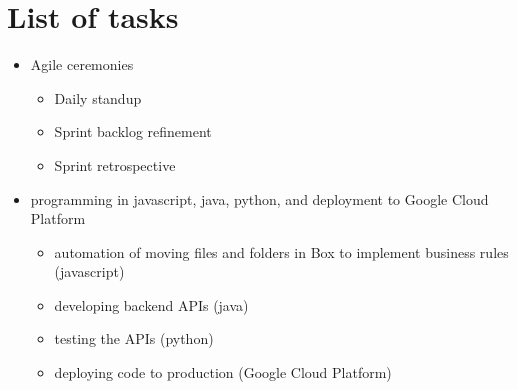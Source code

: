 \documentclass[letterpaper]{article}
\begin{document}
\section*{List of tasks}
\begin{itemize}
	\item Agile ceremonies
	      \begin{itemize}
		      \item Daily standup
		      \item Sprint backlog refinement
		      \item Sprint retrospective
	      \end{itemize}
	\item programming in javascript, java, python, and deployment to Google Cloud
	      Platform
	      \begin{itemize}
		      \item automation of moving files and folders in Box to implement business
		            rules (javascript)
		      \item developing backend APIs (java)
		      \item testing the APIs (python)
		      \item deploying code to production (Google Cloud Platform)
	      \end{itemize}
\end{itemize}
\end{document}
